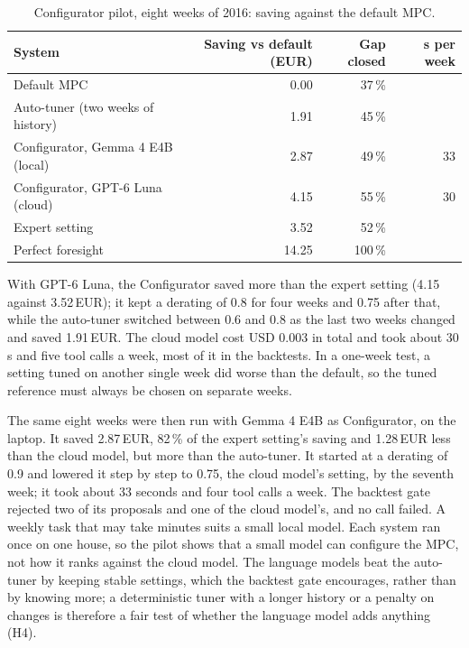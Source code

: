 \begin{table}[htbp]
\caption{Configurator pilot, eight weeks of 2016: saving against the
default MPC.}
\label{tab:configpilot}
\small
\begin{tabularx}{\textwidth}{@{}Xrrr@{}}
\toprule
System & Saving vs default (EUR) & Gap closed & s per week \\
\midrule
Default MPC & 0.00 & 37\,\% & \\
Auto-tuner (two weeks of history) & 1.91 & 45\,\% & \\
Configurator, Gemma 4 E4B (local) & 2.87 & 49\,\% & 33 \\
Configurator, GPT-6 Luna (cloud) & 4.15 & 55\,\% & 30 \\
Expert setting & 3.52 & 52\,\% & \\
Perfect foresight & 14.25 & 100\,\% & \\
\bottomrule
\end{tabularx}
\end{table}

With GPT-6 Luna, the Configurator saved more than the expert setting
(4.15 against 3.52\,EUR); it kept a derating of 0.8 for four weeks and
0.75 after that, while the auto-tuner switched between 0.6 and 0.8 as
the last two weeks changed and saved 1.91\,EUR. The cloud model cost
USD 0.003 in total and took about 30\,s and five tool calls a week,
most of it in the backtests. In a one-week test, a setting tuned on
another single week did worse than the default, so the tuned reference
must always be chosen on separate weeks.

The same eight weeks were then run with Gemma 4 E4B as Configurator, on
the laptop. It saved 2.87\,EUR, 82\,\% of the expert setting's saving
and 1.28\,EUR less than the cloud model, but more than the auto-tuner.
It started at a derating of 0.9 and lowered it step by step to 0.75,
the cloud model's setting, by the seventh week; it took about 33 seconds
and four tool calls a week. The backtest gate rejected two of its
proposals and one of the cloud model's, and no call failed. A weekly
task that may take minutes suits a small local model. Each system ran
once on one house, so the pilot shows that a small model can configure
the MPC, not how it ranks against the cloud model. The language models
beat the auto-tuner by keeping stable settings, which the backtest gate
encourages, rather than by knowing more; a deterministic tuner with a
longer history or a penalty on changes is therefore a fair test of
whether the language model adds anything (H4).

